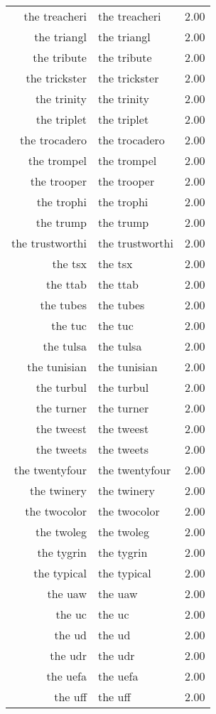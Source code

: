 \begin{table}[ht]
\begin{tabular}{rlr}
  the treacheri & the treacheri & 2.00 \\ 
  the triangl & the triangl & 2.00 \\ 
  the tribute & the tribute & 2.00 \\ 
  the trickster & the trickster & 2.00 \\ 
  the trinity & the trinity & 2.00 \\ 
  the triplet & the triplet & 2.00 \\ 
  the trocadero & the trocadero & 2.00 \\ 
  the trompel & the trompel & 2.00 \\ 
  the trooper & the trooper & 2.00 \\ 
  the trophi & the trophi & 2.00 \\ 
  the trump & the trump & 2.00 \\ 
  the trustworthi & the trustworthi & 2.00 \\ 
  the tsx & the tsx & 2.00 \\ 
  the ttab & the ttab & 2.00 \\ 
  the tubes & the tubes & 2.00 \\ 
  the tuc & the tuc & 2.00 \\ 
  the tulsa & the tulsa & 2.00 \\ 
  the tunisian & the tunisian & 2.00 \\ 
  the turbul & the turbul & 2.00 \\ 
  the turner & the turner & 2.00 \\ 
  the tweest & the tweest & 2.00 \\ 
  the tweets & the tweets & 2.00 \\ 
  the twentyfour & the twentyfour & 2.00 \\ 
  the twinery & the twinery & 2.00 \\ 
  the twocolor & the twocolor & 2.00 \\ 
  the twoleg & the twoleg & 2.00 \\ 
  the tygrin & the tygrin & 2.00 \\ 
  the typical & the typical & 2.00 \\ 
  the uaw & the uaw & 2.00 \\ 
  the uc & the uc & 2.00 \\ 
  the ud & the ud & 2.00 \\ 
  the udr & the udr & 2.00 \\ 
  the uefa & the uefa & 2.00 \\ 
  the uff & the uff & 2.00 \\ 

\end{tabular}
\end{table}
